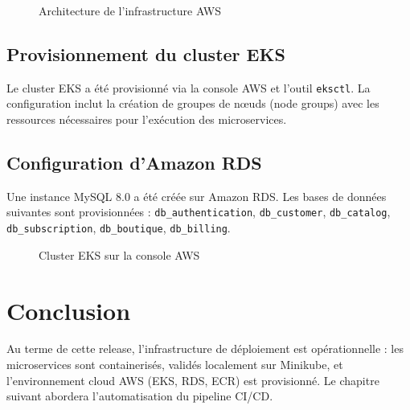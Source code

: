 \begin{figure}[H]
    \centering
    \caption{Architecture de l'infrastructure AWS}
    \label{fig:aws_architecture}
\end{figure}

\subsection{Provisionnement du cluster EKS}
Le cluster EKS a été provisionné via la console AWS et l'outil \texttt{eksctl}. La configuration inclut la création de groupes de n\oe{}uds (node groups) avec les ressources nécessaires pour l'exécution des microservices.

\subsection{Configuration d'Amazon RDS}
Une instance MySQL 8.0 a été créée sur Amazon RDS. Les bases de données suivantes sont provisionnées :
\texttt{db\_authentication}, \texttt{db\_customer}, \texttt{db\_catalog}, \texttt{db\_subscription}, \texttt{db\_boutique}, \texttt{db\_billing}.

\begin{figure}[H]
    \centering
    \caption{Cluster EKS sur la console AWS}
    \label{fig:aws_eks}
\end{figure}

\section*{Conclusion}
Au terme de cette release, l'infrastructure de déploiement est opérationnelle : les microservices sont containerisés, validés localement sur Minikube, et l'environnement cloud AWS (EKS, RDS, ECR) est provisionné. Le chapitre suivant abordera l'automatisation du pipeline CI/CD.

\newpage
